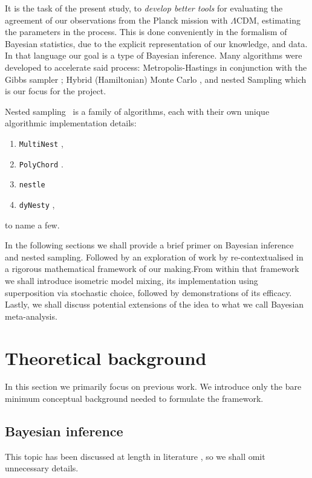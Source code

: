 \documentclass[usenatbib]{mnras}
\begin{document}
It is the task of the present study, to \emph{develop better tools}
for evaluating the agreement of our observations from the Planck
mission with \(\Lambda\)CDM, estimating the parameters in the process.
This is done conveniently in the formalism of Bayesian statistics, due
to the explicit representation of our knowledge, and data. In that
language our goal is a type of Bayesian inference. Many algorithms
were developed to accelerate said process: Metropolis-Hastings
\citep{Metropolis} in conjunction with the Gibbs sampler
\citep{Metropolis-Hastings-Gibbs}; Hybrid (Hamiltonian) Monte Carlo
\citep{1701.02434,Duane_1987}, and nested Sampling
\citep{Skilling2006} which is our focus for the project. 

Nested sampling~\cite{Skilling2006} is a family of algorithms, each
with their own unique algorithmic implementation details:
\begin{enumerate}
\item \texttt{MultiNest} \citep{Feroz2009MultiNestAE},
\item \texttt{PolyChord} \citep{polychord}.
\item \texttt{nestle} \citep{nestle}
\item \texttt{dyNesty} \citep{Speagle_2020},
\end{enumerate}
to name a few.  

In the following sections we shall provide a brief primer on Bayesian
inference and nested sampling. Followed by an exploration of work by
\cite{chen-ferroz-hobson} re-contextualised in a rigorous mathematical
framework of our making.From within that framework we shall introduce
isometric model mixing, its implementation using superposition via
stochastic choice, followed by demonstrations of its efficacy. Lastly,
we shall discuss potential extensions of the idea to what we call
Bayesian meta-analysis.

\section{Theoretical background}\label{sec:orge6061a4}
In this section we primarily focus on previous work. We introduce only
the bare minimum conceptual background needed to formulate the
framework.

\subsection{Bayesian inference}\label{sec:primer}

This topic has been discussed at length in literature
\citep{jeffreys2010scientific}, so we shall omit unnecessary details.
\end{document}
